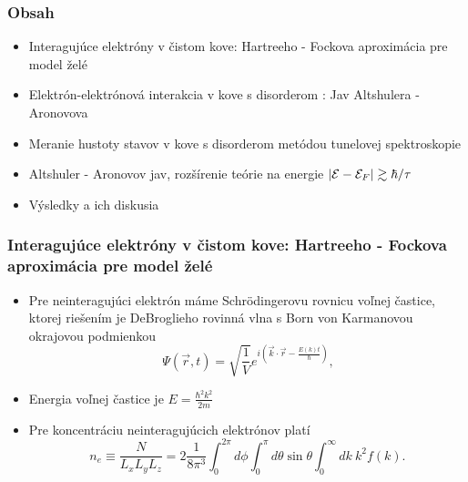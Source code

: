 \documentclass[
	11pt, %
]{beamer}
\begin{document}
\begin{frame}
	\frametitle{Obsah} %
	\begin{itemize}
	\item Interagujúce elektróny v čistom kove: Hartreeho - Fockova aproximácia pre model želé
	\item Elektrón-elektrónová interakcia v kove s disorderom : Jav Altshulera - Aronovova
	\item Meranie hustoty stavov v kove s disorderom metódou tunelovej spektroskopie
	\item Altshuler - Aronovov jav, rozšírenie teórie na energie $|\mathcal{E} - \mathcal{E}_F| \gtrsim \hbar/\tau$
	\item Výsledky a ich diskusia
	\end{itemize}
\end{frame}
\begin{frame}
\frametitle{Interagujúce elektróny v čistom kove: Hartreeho - Fockova aproximácia pre model želé}
\begin{itemize}
\item Pre neinteragujúci elektrón máme Schr\"odingerovu rovnicu voľnej častice,
ktorej riešením je DeBroglieho rovinná vlna s Born von Karmanovou okrajovou podmienkou
\begin{equation}
\label{eq:fp}
 \Psi(\vec r,t)=\sqrt{\frac{1}{V}}e^{i(\vec k\cdot\vec r-\frac{E(k)t}{\hbar})} \text{,}
\end{equation}
\item Energia voľnej častice je $E=\frac{\hbar^2k^2}{2m}$
\item Pre koncentráciu neinteragujúcich elektrónov platí
\begin{equation}
 \label{eq:N integral sfercky}
 n_e \equiv \frac{N}{L_xL_yL_z} = 2 \frac{1}{8\pi^3} \int_0^{2\pi} d\phi \int_0^{\pi}  d\theta \sin{\theta} \int_0^{\infty} dk\ k^2 f(k)  \text{.}
\end{equation}
\end{itemize}
\end{frame}
\end{document}
